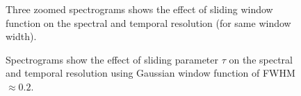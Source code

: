 \documentclass{article}
\begin{document}
\begin{figure}[!h]
\caption{Three zoomed spectrograms shows the effect of sliding window function on the spectral and temporal resolution (for same window width). }
\label{fig:function}
\end{figure}

\begin{figure}[!h]
\caption{Spectrograms show the effect of sliding parameter $\tau$ on the spectral and temporal resolution using Gaussian window function of FWHM $\approx 0.2$.}
\label{fig:sliding}
\end{figure}
\end{document}
